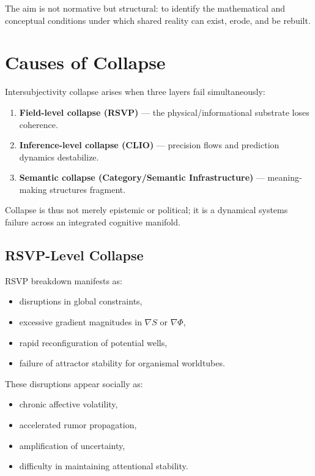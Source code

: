 \documentclass[12pt,oneside]{book}
\theoremstyle{plain}
\theoremstyle{definition}
\begin{document}
The aim is not normative but structural:  
to identify the mathematical and conceptual conditions under which shared reality 
can exist, erode, and be rebuilt.

\section{Causes of Collapse}
\label{sec:causes}

Intersubjectivity collapse arises when three layers fail simultaneously:

\begin{enumerate}
    \item \textbf{Field-level collapse (RSVP)} — the physical/informational substrate 
          loses coherence.
    \item \textbf{Inference-level collapse (CLIO)} — precision flows and prediction 
          dynamics destabilize.
    \item \textbf{Semantic collapse (Category/Semantic Infrastructure)} — 
          meaning-making structures fragment.
\end{enumerate}

Collapse is thus not merely epistemic or political;  
it is a dynamical systems failure across an integrated cognitive manifold.

\subsection{RSVP-Level Collapse}

RSVP breakdown manifests as:

\begin{itemize}
    \item disruptions in global constraints,
    \item excessive gradient magnitudes in $\nabla S$ or $\nabla\Phi$,
    \item rapid reconfiguration of potential wells,
    \item failure of attractor stability for organismal worldtubes.
\end{itemize}

These disruptions appear socially as:

\begin{itemize}
    \item chronic affective volatility,
    \item accelerated rumor propagation,
    \item amplification of uncertainty,
    \item difficulty in maintaining attentional stability.
\end{itemize}
\end{document}
